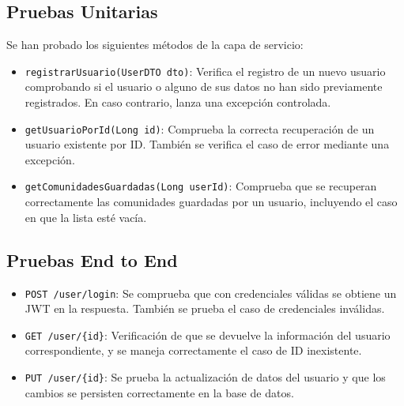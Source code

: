 \subsection{Pruebas Unitarias}
Se han probado los siguientes métodos de la capa de servicio:
\begin{itemize}
    \item \texttt{registrarUsuario(UserDTO dto)}: Verifica el registro de un nuevo usuario comprobando si el usuario o alguno de sus datos no han sido previamente registrados. En caso contrario, lanza una excepción controlada.
    \item \texttt{getUsuarioPorId(Long id)}: Comprueba la correcta recuperación de un usuario existente por ID. También se verifica el caso de error mediante una excepción.
    \item \texttt{getComunidadesGuardadas(Long userId)}: Comprueba que se recuperan correctamente las comunidades guardadas por un usuario, incluyendo el caso en que la lista esté vacía.
\end{itemize}

\subsection{Pruebas End to End}
\begin{itemize}
    \item \texttt{POST /user/login}: Se comprueba que con credenciales válidas se obtiene un JWT en la respuesta. También se prueba el caso de credenciales inválidas.
    \item \texttt{GET /user/\{id\}}: Verificación de que se devuelve la información del usuario correspondiente, y se maneja correctamente el caso de ID inexistente.
    \item \texttt{PUT /user/\{id\}}: Se prueba la actualización de datos del usuario y que los cambios se persisten correctamente en la base de datos.
\end{itemize}

